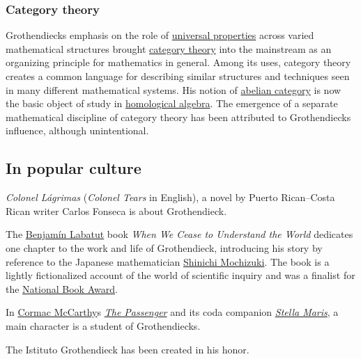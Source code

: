 \subsubsection{Category theory}\label{Category_theory}

Grothendieck\textquotesingle s emphasis on the role of \href{https://en.wikipedia.org/wiki/Universal_property}{universal properties} across varied mathematical structures brought \href{https://en.wikipedia.org/wiki/Category_theory}{category theory} into the mainstream as an organizing principle for mathematics in general. Among its uses, category theory creates a common language for describing similar structures and techniques seen in many different mathematical systems. His notion of \href{https://en.wikipedia.org/wiki/Abelian_category}{abelian category} is now the basic object of study in \href{https://en.wikipedia.org/wiki/Homological_algebra}{homological algebra}. The emergence of a separate mathematical discipline of category theory has been attributed to Grothendieck\textquotesingle s influence, although unintentional.


\subsection{In popular culture}\label{In_popular_culture}

\emph{Colonel Lágrimas} (\emph{Colonel Tears} in English), a novel by Puerto Rican--Costa Rican writer Carlos Fonseca is about Grothendieck.

The \href{https://en.wikipedia.org/wiki/Benjamín_Labatut}{Benjamín Labatut} book \emph{When We Cease to Understand the World} dedicates one chapter to the work and life of Grothendieck, introducing his story by reference to the Japanese mathematician \href{https://en.wikipedia.org/wiki/Shinichi_Mochizuki}{Shinichi Mochizuki}. The book is a lightly fictionalized account of the world of scientific inquiry and was a finalist for the \href{https://en.wikipedia.org/wiki/National_Book_Award}{National Book Award}.

In \href{https://en.wikipedia.org/wiki/Cormac_McCarthy}{Cormac McCarthy}\textquotesingle s \emph{\href{https://en.wikipedia.org/wiki/The_Passenger_(McCarthy_novel)}{The Passenger}} and its coda companion \emph{\href{https://en.wikipedia.org/wiki/Stella_Maris_(novel)}{Stella Maris}}, a main character is a student of Grothendieck\textquotesingle s.

The Istituto Grothendieck has been created in his honor.

